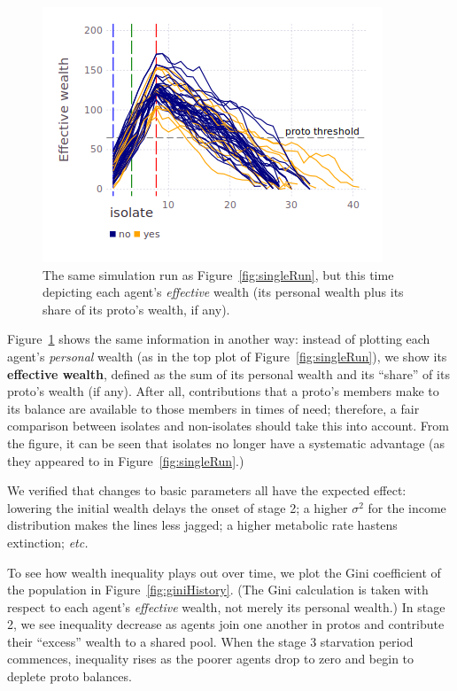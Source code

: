 \begin{figure}[ht]
\centering
\includegraphics[width=\columnwidth]{figures/sampleEffectiveHistory.png}
\caption{The same simulation run as Figure~\ref{fig:singleRun}, but this time
depicting each agent's \textit{effective} wealth (its personal wealth plus its
share of its proto's wealth, if any).}
\label{fig:effectiveWealthSingleRun}
\end{figure}

Figure~\ref{fig:effectiveWealthSingleRun} shows the same information in another
way: instead of plotting each agent's \textit{personal} wealth (as in the top
plot of Figure~\ref{fig:singleRun}), we show its \textbf{effective wealth},
defined as the sum of its personal wealth and its ``share'' of its proto's
wealth (if any). After all, contributions that a proto's members make to its
balance are available to those members in times of need; therefore, a fair
comparison between isolates and non-isolates should take this into account.
From the figure, it can be seen that isolates no longer have a systematic
advantage (as they appeared to in Figure~\ref{fig:singleRun}.)

We verified that changes to basic parameters all have the expected effect:
lowering the initial wealth delays the onset of stage 2; a higher $\sigma^2$
for the income distribution makes the lines less jagged; a higher metabolic
rate hastens extinction; \textit{etc.}

To see how wealth inequality plays out over time, we plot the Gini coefficient
of the population in Figure~\ref{fig:giniHistory}. (The Gini calculation is
taken with respect to each agent's \textit{effective} wealth, not merely its
personal wealth.) In stage 2, we see inequality decrease as agents join one
another in protos and contribute their ``excess'' wealth to a shared pool. When
the stage 3 starvation period commences, inequality rises as the poorer agents
drop to zero and begin to deplete proto balances.


